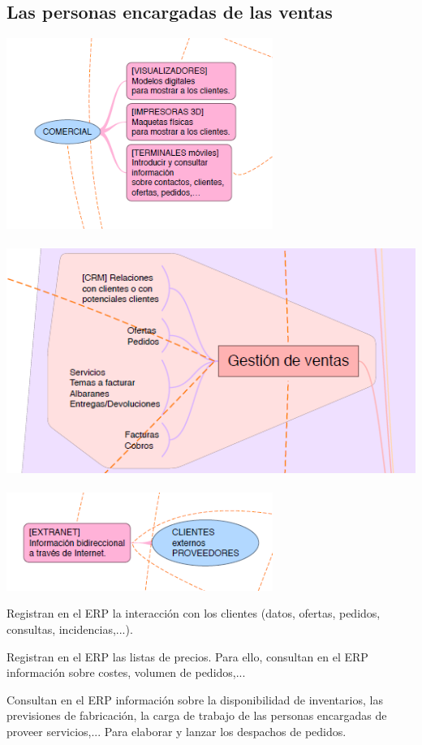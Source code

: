 \documentclass[spanish,12pt,a4paper,final,oneside]{book}
\begin{document}
\subsection{Las personas encargadas de las ventas}
\includegraphics[width=0.65\textwidth]{subesquema - ventas01}
\\\\ \includegraphics[width=\textwidth]{subesquema - ventas02}
\\\\ \includegraphics[width=0.65\textwidth]{subesquema - ventas03}

Registran en el ERP la interacción con los clientes (datos, ofertas, pedidos, consultas, incidencias,...). 

Registran en el ERP las listas de precios. Para ello, consultan en el ERP información sobre costes, volumen de pedidos,...

Consultan en el ERP información sobre la disponibilidad de inventarios, las previsiones de fabricación, la carga de trabajo de las personas encargadas de proveer servicios,... Para elaborar y lanzar los despachos de pedidos. 
\end{document}
